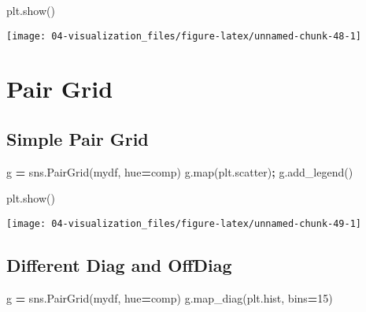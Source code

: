 \documentclass[
]{book}
\newenvironment{Shaded}{\begin{snugshade}}{\end{snugshade}}
\newcommand{\BuiltInTok}[1]{#1}
\newcommand{\DecValTok}[1]{\textcolor[rgb]{0.06,0.06,0.06}{#1}}
\newcommand{\NormalTok}[1]{#1}
\newcommand{\OperatorTok}[1]{\textcolor[rgb]{0.43,0.43,0.43}{\textbf{#1}}}
\newcommand{\StringTok}[1]{\textcolor[rgb]{0.5,0.5,0.5}{#1}}
\begin{document}
\begin{Shaded}
\begin{Highlighting}[]
\NormalTok{plt.show()}
\end{Highlighting}
\end{Shaded}

\texttt{[image: 04-visualization\_files/figure-latex/unnamed-chunk-48-1]}

\hypertarget{pair-grid}{%
\section{Pair Grid}\label{pair-grid}}

\hypertarget{simple-pair-grid}{%
\subsection{Simple Pair Grid}\label{simple-pair-grid}}

\begin{Shaded}
\begin{Highlighting}[]
\NormalTok{g }\OperatorTok{=}\NormalTok{ sns.PairGrid(mydf, hue}\OperatorTok{=}\StringTok{\textquotesingle{}comp\textquotesingle{}}\NormalTok{)}
\NormalTok{g.}\BuiltInTok{map}\NormalTok{(plt.scatter)}\OperatorTok{;}
\NormalTok{g.add\_legend()}
\end{Highlighting}
\end{Shaded}

\begin{Shaded}
\begin{Highlighting}[]
\NormalTok{plt.show()}
\end{Highlighting}
\end{Shaded}

\texttt{[image: 04-visualization\_files/figure-latex/unnamed-chunk-49-1]}

\hypertarget{different-diag-and-offdiag}{%
\subsection{Different Diag and OffDiag}\label{different-diag-and-offdiag}}

\begin{Shaded}
\begin{Highlighting}[]
\NormalTok{g }\OperatorTok{=}\NormalTok{ sns.PairGrid(mydf, hue}\OperatorTok{=}\StringTok{\textquotesingle{}comp\textquotesingle{}}\NormalTok{)}
\NormalTok{g.map\_diag(plt.hist, bins}\OperatorTok{=}\DecValTok{15}\NormalTok{)}
\end{Highlighting}
\end{Shaded}
\end{document}

